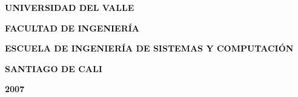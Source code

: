 \begin{center} \textbf{UNIVERSIDAD DEL VALLE} \end{center}
\begin{center} \textbf{FACULTAD DE INGENIERÍA} \end{center}
\begin{center} \textbf{ESCUELA DE INGENIERÍA DE SISTEMAS Y COMPUTACIÓN} \end{center}
\begin{center} \textbf{SANTIAGO DE CALI} \end{center}
\begin{center} \textbf{2007} \end{center}

\newpage
